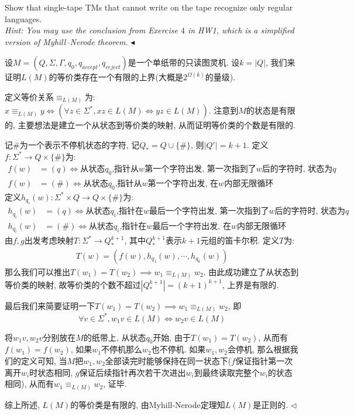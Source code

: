 \documentclass[11pt]{article}
\newenvironment{problem}[2][Problem]{\begin{trivlist}
\item[\hskip \labelsep{\bfseries#1}\hskip\labelsep{\bfseries#2.}]}{\hfill$\blacktriangleleft$\end{trivlist}}
\newenvironment{answer}[1][Answer]{\begin{trivlist}
\item[\hskip \labelsep{\bfseries\itshape#1.}\hskip \labelsep]}{\hfill$\lhd$\end{trivlist}}
\begin{document}
\begin{problem}{7.(16 points)}
    Show that single-tape TMs that cannot write on the tape recognize only regular languages.
    \\ \textit{Hint: You may use the conclusion from Exercise $4$ in HW1, which is a simplified version of Myhill–Nerode theorem. }
\end{problem}
\begin{answer}
    设$M = (Q, \Sigma, \Gamma, q_0, q_{accept}, q_{reject})$是一个单纸带的只读图灵机. 设$k = |Q|$, 我们来证明$L(M)$的等价类存在一个有限的上界(大概是$2^{\Omega(k)}$的量级).

    定义等价关系$\equiv_{L(M)}$为: $x \equiv_{L(M)} y \iff (\forall z \in \Sigma^*, xz \in L(M) \iff yz \in L(M))$. 注意到$M$的状态是有限的, 主要想法是建立一个从状态到等价类的映射, 从而证明等价类的个数是有限的.

    记$\#$为一个表示不停机状态的字符, 记$Q_* = Q \cup \{\#\}$, 则$|Q'| = k + 1$. 定义$f: \Sigma^* \rightarrow Q \times \{\#\}$为:
    \begin{align*}
        f(w) &= (q) \iff \text{从状态$q_0$,指针从$w$第一个字符出发, 第一次指到了$w$后的字符时, 状态为$q$} \\
        f(w) &= (\#) \iff \text{从状态$q_0$,指针从$w$第一个字符出发, 在$w$内部无限循环} 
    \end{align*}
    定义$h_{q_i}(w) : \Sigma^*\times Q \rightarrow Q \times \{\#\}$为:
    \begin{align*}
        h_{q_i}(w) &= (q) \iff \text{从状态$q_i$,指针在$w$最后一个字符出发, 第一次指到了$w$后的字符时, 状态为$q$} \\
        h_{q_i}(w) &= (\#) \iff \text{从状态$q_i$,指针在$w$最后一个字符出发, 在$w$内部无限循环}
    \end{align*}
    由$f,g$出发考虑映射$T: \Sigma^* \rightarrow Q_*^{k+1}$, 其中$Q_*^{k+1}$表示$k+1$元组的笛卡尔积. 定义$T$为:
    \begin{align*}
        T(w) = (f(w), h_{q_1}(w), \cdots, h_{q_k}(w))
    \end{align*}
    那么我们可以推出$T(w_1) =T(w_2) \implies w_1 \equiv_{L(M)} w_2$. 由此成功建立了从状态到等价类的映射, 故等价类的个数不超过$|Q_*^{k+1}| = (k + 1)^{k+1}$, 上界是有限的.

    最后我们来简要证明一下$T(w_1) = T(w_2) \implies w_1 \equiv_{L(M)} w_2$, 即\[\forall v \in \Sigma^*, w_1 v \in L(M) \iff w_2 v \in L(M)\]

    将$w_1v, w_2v$分别放在$M$的纸带上, 从状态$q_0$开始, 由于$T(w_1) = T(w_2)$, 从而有$f(w_1) = f(w_2)$, 如果$w_1$不停机那么$w_2$也不停机. 如果$w_1,w_2$会停机, 那么根据我们的定义可知, 当$M$把$w_1, w_2$全部读完时能够保持在同一状态下($f$保证指针第一次离开$w_i$时状态相同, $g$保证后续指针再次若干次进出$w_i$到最终读取完整个$w_i$的状态相同), 从而有$w_1 \equiv_{L(M)} w_2$, 证毕.

    综上所述, $L(M)$的等价类是有限的, 由Myhill-Nerode定理知$L(M)$是正则的.
\end{answer}
\end{document}
